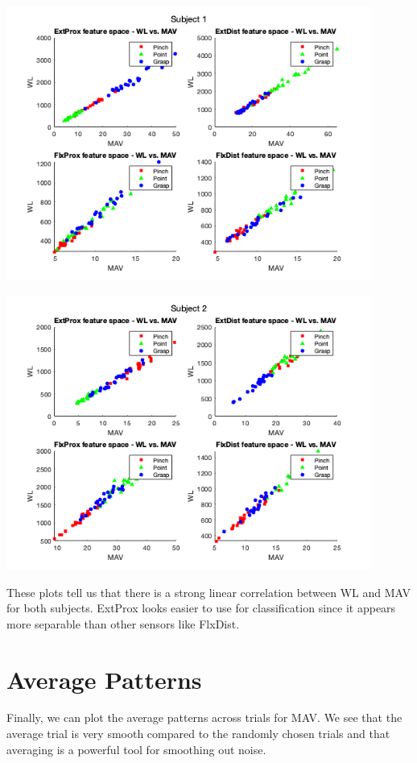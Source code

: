 \documentclass[12pt]{article}
\begin{document}
\begin{center}
    \includegraphics[width=0.9\textwidth]{subject1.png}
\end{center}

\begin{center}
    \includegraphics[width=0.9\textwidth]{subject2.png}
\end{center}

These plots tell us that there is a strong linear correlation between WL and MAV for both subjects. ExtProx looks easier to use for classification since it appears more separable than other sensors like FlxDist.

\section{Average Patterns}

Finally, we can plot the average patterns across trials for MAV. We see that the average trial is very smooth compared to the randomly chosen trials and that averaging is a powerful tool for smoothing out noise. 
\end{document}
